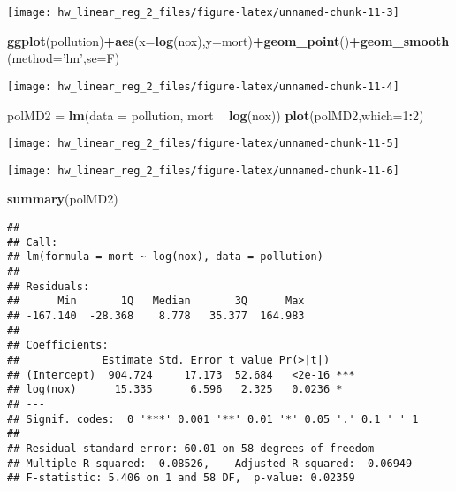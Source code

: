 \documentclass[]{article}
\newenvironment{Shaded}{\begin{snugshade}}{\end{snugshade}}
\newcommand{\DataTypeTok}[1]{\textcolor[rgb]{0.13,0.29,0.53}{#1}}
\newcommand{\DecValTok}[1]{\textcolor[rgb]{0.00,0.00,0.81}{#1}}
\newcommand{\KeywordTok}[1]{\textcolor[rgb]{0.13,0.29,0.53}{\textbf{#1}}}
\newcommand{\NormalTok}[1]{#1}
\newcommand{\OperatorTok}[1]{\textcolor[rgb]{0.81,0.36,0.00}{\textbf{#1}}}
\newcommand{\StringTok}[1]{\textcolor[rgb]{0.31,0.60,0.02}{#1}}
\begin{document}
\begin{center}\texttt{[image: hw\_linear\_reg\_2\_files/figure-latex/unnamed-chunk-11-3]} \end{center}

\begin{Shaded}
\begin{Highlighting}[]
\KeywordTok{ggplot}\NormalTok{(pollution)}\OperatorTok{+}\KeywordTok{aes}\NormalTok{(}\DataTypeTok{x=}\KeywordTok{log}\NormalTok{(nox),}\DataTypeTok{y=}\NormalTok{mort)}\OperatorTok{+}\KeywordTok{geom_point}\NormalTok{()}\OperatorTok{+}\KeywordTok{geom_smooth}\NormalTok{(}\DataTypeTok{method=}\StringTok{'lm'}\NormalTok{,}\DataTypeTok{se=}\NormalTok{F)}
\end{Highlighting}
\end{Shaded}

\begin{center}\texttt{[image: hw\_linear\_reg\_2\_files/figure-latex/unnamed-chunk-11-4]} \end{center}

\begin{Shaded}
\begin{Highlighting}[]
\NormalTok{polMD2 =}\StringTok{ }\KeywordTok{lm}\NormalTok{(}\DataTypeTok{data =}\NormalTok{ pollution, mort }\OperatorTok{~}\StringTok{ }\KeywordTok{log}\NormalTok{(nox))}
\KeywordTok{plot}\NormalTok{(polMD2,}\DataTypeTok{which=}\DecValTok{1}\OperatorTok{:}\DecValTok{2}\NormalTok{)}
\end{Highlighting}
\end{Shaded}

\begin{center}\texttt{[image: hw\_linear\_reg\_2\_files/figure-latex/unnamed-chunk-11-5]} \end{center}

\begin{center}\texttt{[image: hw\_linear\_reg\_2\_files/figure-latex/unnamed-chunk-11-6]} \end{center}

\begin{Shaded}
\begin{Highlighting}[]
\KeywordTok{summary}\NormalTok{(polMD2)}
\end{Highlighting}
\end{Shaded}

\begin{verbatim}
## 
## Call:
## lm(formula = mort ~ log(nox), data = pollution)
## 
## Residuals:
##      Min       1Q   Median       3Q      Max 
## -167.140  -28.368    8.778   35.377  164.983 
## 
## Coefficients:
##             Estimate Std. Error t value Pr(>|t|)    
## (Intercept)  904.724     17.173  52.684   <2e-16 ***
## log(nox)      15.335      6.596   2.325   0.0236 *  
## ---
## Signif. codes:  0 '***' 0.001 '**' 0.01 '*' 0.05 '.' 0.1 ' ' 1
## 
## Residual standard error: 60.01 on 58 degrees of freedom
## Multiple R-squared:  0.08526,    Adjusted R-squared:  0.06949 
## F-statistic: 5.406 on 1 and 58 DF,  p-value: 0.02359
\end{verbatim}
\end{document}

